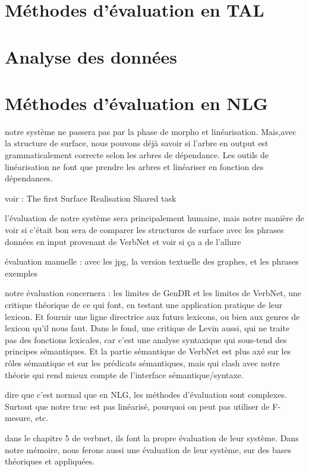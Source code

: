 \section{Méthodes d'évaluation en TAL}

\section{Analyse des données}


\section{Méthodes d'évaluation en NLG}

notre système ne passera pas par la phase de morpho et linéarisation. Mais,avec la structure de surface, nous pouvons déjà savoir si l'arbre en output est grammaticalement correcte selon les arbres de dépendance. Les outils de linéarisation ne font que prendre les arbres et linéariser en fonction des dépendances. 

voir : The first Surface Realisation Shared task

l'évaluation de notre système sera principalement humaine, mais notre manière de voir si c'était bon sera de comparer les structures de surface avec les phrases données en input provenant de VerbNet et voir si ça a de l'allure

évaluation manuelle : avec les jpg, la version textuelle des graphes, et les phrases exemples

notre évaluation concernera : les limites de GenDR et les limites de VerbNet, une critique théorique de ce qui font, en testant une application pratique de leur lexicon. Et fournir une ligne directrice aux futurs lexicons, ou bien aux genres de lexicon qu'il nous faut. Dans le fond, une critique de Levin aussi, qui ne traite pas des fonctions lexicales, car c'est une analyse syntaxique qui sous-tend des principes sémantiques. Et la partie sémantique de VerbNet est plus axé sur les rôles sémantique et sur les prédicats sémantiques, mais qui clash avec notre théorie qui rend mieux compte de l'interface sémantique/syntaxe.

dire que c'est normal que en NLG, les méthodes d'évaluation sont complexes. Surtout que notre truc est pas linéarisé, pourquoi on peut pas utiliser de F-mesure, etc.

dans le chapitre 5 de verbnet, ils font la propre évaluation de leur système. Dans notre mémoire, nous ferons aussi une évaluation de leur système, sur des bases théoriques et appliquées.